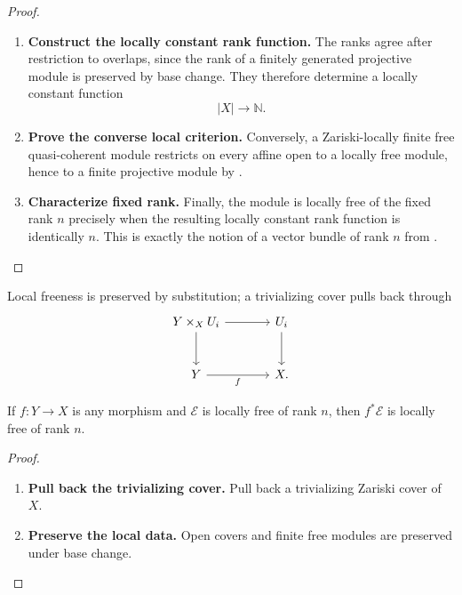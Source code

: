 \begin{proof}
\begin{enumerate}[label=\textup{(\arabic*)}]
    \item \textbf{Construct the locally constant rank function.}
    The ranks agree after restriction to overlaps, since the rank of a
    finitely generated projective module is preserved by base change.
    They therefore determine a locally constant function
    \[
        |X|\longrightarrow\mathbb N.
    \]

    \item \textbf{Prove the converse local criterion.}
    Conversely, a Zariski-locally finite free quasi-coherent module restricts
    on every affine open to a locally free module, hence to a finite
    projective module by
    .

    \item \textbf{Characterize fixed rank.}
    Finally, the module is locally free of the fixed rank \(n\) precisely
    when the resulting locally constant rank function is identically \(n\).
    This is exactly the notion of a vector bundle of rank \(n\) from
    .
\end{enumerate}
\end{proof}

Local freeness is preserved by substitution; a trivializing cover pulls back
through
\[
\begin{tikzcd}[column sep=large, row sep=large]
    Y\times_XU_i \arrow[r] \arrow[d]
        & U_i \arrow[d] \\
    Y \arrow[r, "f"'] & X.
\end{tikzcd}
\]

\begin{proposition}
\label{prop:base-change-locally-free}
If $f:Y\to X$ is any morphism and $\mathcal E$ is locally free of rank
$n$, then $f^*\mathcal E$ is locally free of rank $n$.
\end{proposition}

\begin{proof}
\leavevmode
\begin{enumerate}[label=\textup{(\arabic*)}]
    \item \textbf{Pull back the trivializing cover.}
    Pull back a trivializing Zariski cover of $X$.

    \item \textbf{Preserve the local data.}
    Open covers and finite free
    modules are preserved under base change.
\end{enumerate}
\end{proof}

